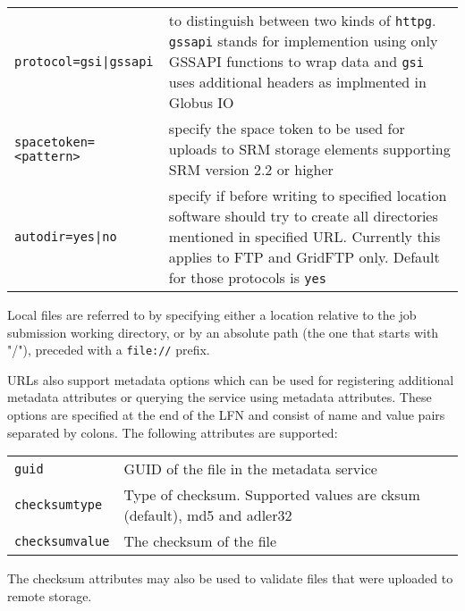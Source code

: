 \begin{longtable}{lp{10cm}}
   \verb#protocol=gsi|gssapi# & to distinguish between two kinds of
   \verb#httpg#. \verb#gssapi# stands for implemention using only GSSAPI
   functions to wrap data and \verb#gsi# uses additional headers as
   implmented in Globus IO\\
   \verb#spacetoken=<pattern># & specify the space token to be used for
   uploads to SRM storage elements supporting SRM version 2.2 or higher\\
   \verb#autodir=yes|no# & specify if before writing to specified location
   software should try to create all directories mentioned in specified
   URL. Currently this applies to FTP and GridFTP only. Default for those
   protocols is \verb#yes#\\
\end{longtable}

Local files are referred to by specifying either a location relative
to the job submission working directory, or by an absolute path (the
one that starts with "/"), preceded with a \verb#file://# prefix.

URLs also support metadata options which can be used for registering
additional metadata attributes or querying the service using metadata
attributes. These options are specified at the end of the LFN and
consist of name and value pairs separated by colons. The following
attributes are supported:

\begin{tabular}{lp{10cm}}
   \verb#guid# & GUID of the file in the metadata service \\
   \verb#checksumtype# & Type of checksum. Supported values are cksum
   (default), md5 and adler32 \\
   \verb#checksumvalue# & The checksum of the file \\
\end{tabular}

The checksum attributes may also be used to validate files that were
uploaded to remote storage.

